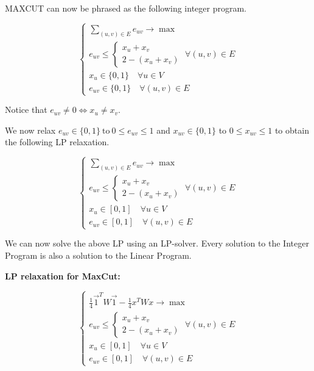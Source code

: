 \documentclass[12pt]{article}
\begin{document}
MAXCUT can now be phrased as the following integer program.

\begin{equation}
\begin{cases}
\sum\limits_{(u,v) \in E} e_{uv} \longrightarrow \max \\

e_{uv} \le \begin{cases}
x_u + x_v \\
2 - (x_u + x_v)
\end{cases}
\; \forall (u,v) \in E\\

x_u \in \{0,1\} \quad \forall u \in V\\

e_{uv} \in \{0,1\} \quad \forall (u,v) \in E
\end{cases}
\end{equation}

Notice that $e_{uv} \ne 0 \Longleftrightarrow x_u \ne x_v$.

We now relax $e_{uv} \in \{0,1\} \ \text{to} \ 0 \le e_{uv} \le 1$ and $x_{uv} \in \{ 0,1\}$ to 
$0 \le x_{uv} \le 1$ to obtain the following LP relaxation.

\begin{equation}
\begin{cases}
\sum\limits_{(u,v) \in E} e_{uv} \longrightarrow \max \\

e_{uv} \le \begin{cases}
x_u + x_v \\
2 - (x_u + x_v)
\end{cases}
\; \forall (u,v) \in E\\

x_u \in [0,1] \quad \forall u \in V\\

e_{uv} \in [0,1] \quad \forall (u,v) \in E
\end{cases}
\end{equation}

We can now solve the above LP using an LP-solver. Every solution to the Integer
Program is also a solution to the Linear Program. 

\textbf{LP relaxation for MaxCut:}

\begin{equation}
\begin{cases}
\frac14 \vec 1^T W \vec 1 - \frac14 x^T W x \longrightarrow \max \\

e_{uv} \le \begin{cases}
x_u + x_v \\
2 - (x_u + x_v)
\end{cases}
\; \forall (u,v) \in E\\

x_u \in [0,1] \quad \forall u \in V\\

e_{uv} \in [0,1] \quad \forall (u,v) \in E
\end{cases}
\end{equation}
\end{document}
